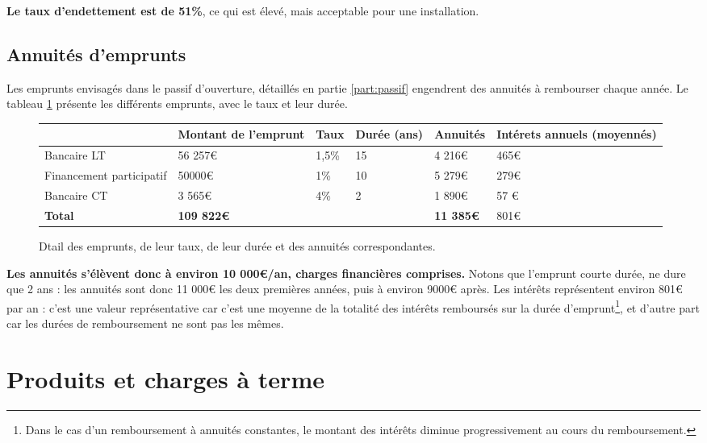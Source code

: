 \documentclass{book}
\begin{document}
\textbf{Le taux d'endettement est de 51\%}, ce qui est élevé, mais acceptable pour une installation.

\subsection{Annuités d'emprunts}

Les emprunts envisagés dans le passif d'ouverture, détaillés en partie \ref{part:passif} engendrent des annuités à rembourser chaque année. Le tableau \ref{tab:annuites} présente les différents emprunts, avec le taux et leur durée.

\begin{figure}[h!]
\footnotesize
\center
\begin{tabular}{ | p{} | p{3cm}| p{1cm}| p{}|p{2cm}| p{}|}
\hline
	& Montant de l'emprunt & Taux & Durée (ans) & Annuités & Intérets annuels (moyennés) \\ \hline
	Bancaire LT & 56 257\euro{} & 1,5\% & 15 & 4 216\euro{} & 465\euro{} \\ \hline
	Financement participatif & 50000\euro{} & 1\% & 10 & 5 279\euro{} & 279\euro{} \\ \hline
	Bancaire CT & 3 565\euro{} & 4\% & 2 & 1 890\euro{}  & 57 \euro{} \\ \hline
	\textbf{Total} & \textbf{109 822\euro{}} &  & & \textbf{11 385\euro{}} & 801\euro{} \\ \hline
\end{tabular}
\caption{Dtail des emprunts, de leur taux, de leur durée et des annuités correspondantes.}
\label{tab:annuites}
\end{figure}

\textbf{Les annuités s'élèvent donc à environ 10 000\euro{}/an, charges financières comprises.} Notons que l'emprunt courte durée, ne dure que 2 ans : les annuités sont donc 11 000\euro{} les deux premières années, puis à environ 9000\euro{} après. Les intérêts représentent environ 801\euro{} par an : c'est une valeur représentative car c'est une moyenne de la totalité des intérêts remboursés sur la durée d'emprunt\footnote{Dans le cas d'un remboursement à annuités constantes, le montant des intérêts diminue progressivement au cours du remboursement.}, et d'autre part car les durées de remboursement ne sont pas les mêmes.

\section{Produits et charges à terme}
\end{document}
